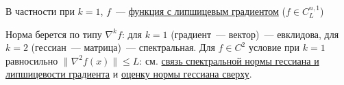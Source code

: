 

\begin{remark}
  В частности при $k=1$, $f$~--- \hyperref[note:7DD1C7AB-1A49-4675-9F21-5A16C717F670]{функция с липшицевым градиентом} ($f \in C^{n,1}_L$)
\end{remark}

\begin{remark}
  Норма берется по типу $\nabla^k f$: для $k = 1$ (градиент~--- вектор)~--- евклидова, для $k = 2$ (гессиан~--- матрица)~--- спектральная. Для $f \in C^2$ условие при $k = 1$ равносильно $\| \nabla^2 f(x) \| \le L$: см. \hyperref[note:4B6D53BA-E599-4DEA-A557-550BD32042BA]{связь спектральной нормы гессиана и липшицевости градиента} и \hyperref[note:DAA0DAE4-4B48-4A2F-9459-54790B6B129F]{оценку нормы гессиана сверху}.
\end{remark}
